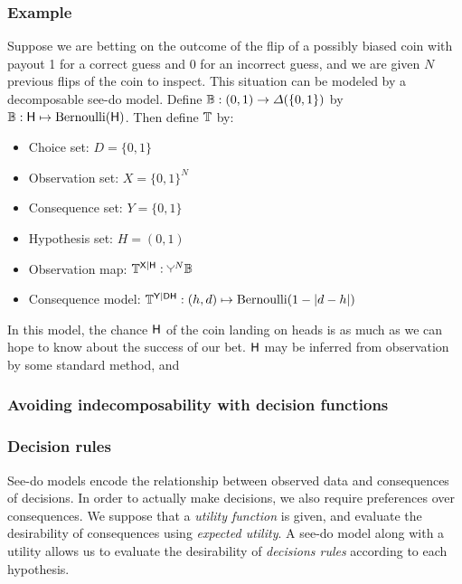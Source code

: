 \subsubsection{Example}

Suppose we are betting on the outcome of the flip of a possibly biased coin with payout 1 for a correct guess and 0 for an incorrect guess, and we are given $N$ previous flips of the coin to inspect. This situation can be modeled by a decomposable see-do model. Define $\mathbb{B}:(0,1)\to \Delta(\{0,1\})$ by $\mathbb{B}:\mathsf{H}\mapsto \mathrm{Bernoulli}(\mathsf{H})$. Then define ${\mathbb{T}}$ by:

\begin{itemize}
    \item Choice set: $D=\{0,1\}$
    \item Observation set: $X=\{0,1\}^N$
    \item Consequence set: $Y=\{0,1\}$
    \item Hypothesis set: $H=(0,1)$
    \item Observation map: ${\kernel{T}}^{\RV{X}|\RV{H}}:\splitter{0.1}^N\kernel{B}$
    \item Consequence model: ${\mathbb{T}}^{\mathsf{Y}|\mathsf{D}\mathsf{H}}:(h,d)\mapsto \mathrm{Bernoulli}(1-|d-h|)$
\end{itemize}

In this model, the chance $\mathsf{H}$ of the coin landing on heads is as much as we can hope to know about the success of our bet. $\mathsf{H}$ may be inferred from observation by some standard method, and 



\subsubsection{Avoiding indecomposability with decision functions}


\subsubsection{Decision rules}

See-do models encode the relationship between observed data and consequences of decisions. In order to actually make decisions, we also require preferences over consequences. We suppose that a \emph{utility function} is given, and evaluate the desirability of consequences using \emph{expected utility}. A see-do model along with a utility allows us to evaluate the desirability of \emph{decisions rules} according to each hypothesis.

